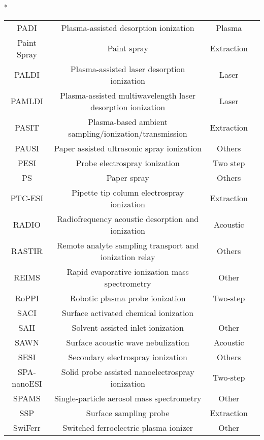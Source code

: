 \begin{table}{*}
\begin{tabular}{|c|c|c|l|}
        PADI & Plasma-assisted desorption ionization & Plasma & \cite{24670045} \\
        Paint Spray & Paint spray & Extraction & \cite{Paine_2012} \\
        PALDI & Plasma-assisted laser desorption ionization & Laser & \cite{24670045} \\
        PAMLDI & Plasma-assisted multiwavelength laser desorption ionization & Laser & \cite{22243032} \\
        PASIT & Plasma-based ambient sampling/ionization/transmission & Extraction & \cite{25147876} \\
        PAUSI & Paper assisted ultrasonic spray ionization & Others & \cite{24664810} \\
        PESI & Probe electrospray ionization & Two step & \cite{17708527}\\
        PS & Paper spray & Others & \cite{20158226} \\
        PTC-ESI & Pipette tip column electrospray ionization & Extraction & \cite{22898704} \\
        RADIO & Radiofrequency acoustic desorption and ionization & Acoustic & \cite{19112029} \\
        RASTIR & Remote analyte sampling transport and ionization relay & Others & \cite{18529018}\\ 
        REIMS & Rapid evaporative ionization mass spectrometry & Other & \cite{19746375}\\
        RoPPI & Robotic plasma probe ionization & Two-step & \cite{24603806} \\
        SACI & Surface activated chemical ionization & & \cite{19199882} \\
        SAII & Solvent-assisted inlet ionization & Other & \cite{21899326} \\
        SAWN & Surface acoustic wave nebulization & Acoustic & \cite{20364823} \\
        SESI & Secondary electrospray ionization & Others & \cite{10658336} \\
        SPA-nanoESI & Solid probe assisted nanoelectrospray ionization & Two-step & \cite{22937532} \\
        SPAMS & Single-particle aerosol mass spectrometry & Other & \cite{19842633} \\
        SSP & Surface sampling probe & Extraction & \cite{20499315} \\
        SwiFerr & Switched ferroelectric plasma ionizer & Other & \cite{21128617} \\

\end{tabular}
\end{table}
